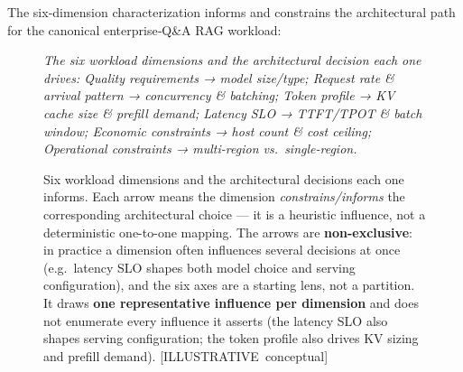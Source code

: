 \label{architecture-consequence}


The six‑dimension characterization informs and constrains the
architectural path for the canonical enterprise‑Q\&A RAG workload:

\begin{figure}
\centering
{}
\caption[Six workload dimensions and the architectural decisions each one informs]{Six workload dimensions and the architectural decisions each one informs. Each arrow means the dimension \emph{constrains/informs} the corresponding architectural choice --- it is a heuristic influence, not a deterministic one-to-one mapping. The arrows are \textbf{non-exclusive}: in practice a dimension often influences several decisions at once (e.g.~latency SLO shapes both model choice and serving configuration), and the six axes are a starting lens, not a partition. It draws \textbf{one representative influence per dimension} and does not enumerate every influence it asserts (the latency SLO also shapes serving configuration; the token profile also drives KV sizing and prefill demand). \mbox{{[}ILLUSTRATIVE conceptual{]}}}

\label{fig:4.1}\emph{The six workload dimensions and the architectural decision each
one drives: Quality requirements → model size/type; Request rate \&
arrival pattern → concurrency \& batching; Token profile → KV cache size
\& prefill demand; Latency SLO → TTFT/TPOT \& batch window; Economic
constraints → host count \& cost ceiling; Operational constraints →
multi-region vs.~single-region.}


\end{figure}
